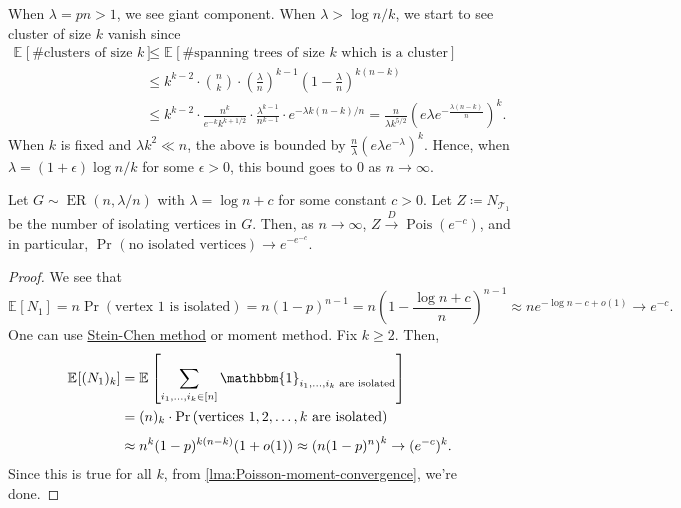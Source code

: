 \begin{prev}
	When \(\lambda = pn > 1\), we see giant component. When \(\lambda > \log n / k\), we start to see cluster of size \(k\) vanish since
	\[
		\begin{split}
			\mathbb{E}_{}[\text{\# clusters of size \(k\)}]
			 & \leq \mathbb{E}_{}[\text{\# spanning trees of size \(k\) which is a cluster} ]                                                \\
			 & \leq k^{k-2} \cdot \binom{n}{k} \cdot \left( \frac{\lambda }{n} \right) ^{k-1} \left( 1 - \frac{\lambda}{n} \right) ^{k(n-k)} \\
			 & \leq k^{k-2} \cdot \frac{n^k}{e^{-k} k^{k + 1 / 2}} \cdot \frac{\lambda ^{k-1}}{n^{k-1}} \cdot e^{- \lambda k(n-k) / n}
			= \frac{n}{\lambda k^{5 / 2}} \left( e \lambda e^{- \frac{\lambda (n-k)}{n}} \right) ^k.
		\end{split}
	\]
	When \(k\) is fixed and \(\lambda k^2 \ll n\), the above is bounded by \(\frac{n}{\lambda } (e \lambda e^{-\lambda })^k\). Hence, when \(\lambda = (1 + \epsilon ) \log n / k\) for some \(\epsilon > 0\), this bound goes to \(0\) as \(n \to \infty \).
\end{prev}

\begin{theorem}
	Let \(G \sim \operatorname{ER}(n, \lambda / n)\) with \(\lambda = \log n + c\) for some constant \(c > 0\). Let \(Z \coloneqq N_{\mathcal{T} _1}\) be the number of isolating vertices in \(G\). Then, as \(n \to \infty \), \(Z \overset{D}{\to} \operatorname{Pois}(e^{-c})\), and in particular, \(\Pr_{}\left(\text{no isolated vertices} \right) \to e^{-e^{-c}}\).
\end{theorem}
\begin{proof}
	We see that
	\[
		\mathbb{E}_{}[N_1]
		= n \Pr_{}\left(\text{vertex \(1\) is isolated} \right)
		= n (1 - p)^{n-1}
		= n \left( 1 - \frac{\log n + c}{n} \right) ^{n-1}
		\approx n e^{-\log n - c + o(1)}
		\to e^{-c}.
	\]
	One can use \hyperref[thm:Stein-Chen-method]{Stein-Chen method} or moment method. Fix \(k \geq 2\). Then,
	\[
		\begin{split}
			\mathbb{E}_{}[(N_1)_k]
			 & = \mathbb{E}_{}\left[\sum_{i_1, \dots , i_k \in [n]} \mathbbm{1}_{i_1, \dots , i_k \text{ are isolated} } \right] \\
			 & = (n)_k \cdot \Pr_{}\left(\text{vertices } 1, 2, \dots , k \text{ are isolated} \right)                           \\
			 & \approx n^k (1-p)^{k (n-k)} (1 + o(1))
			\approx \left( n(1-p)^n \right) ^k
			\to (e^{-c})^k.
		\end{split}
	\]
	Since this is true for all \(k\), from \autoref{lma:Poisson-moment-convergence}, we're done.
\end{proof}


